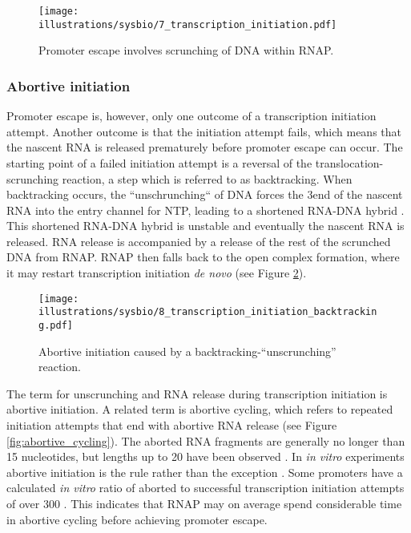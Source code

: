 \begin{figure}[htb]
	\begin{center}
		\texttt{[image: illustrations/sysbio/7\_transcription\_initiation.pdf]}
	\end{center}
	\caption{Promoter escape involves scrunching of DNA within RNAP.}
	\label{fig:simple_escape}
\end{figure}

\subsubsection{Abortive initiation}
Promoter escape is, however, only one outcome of a transcription initiation
attempt. Another outcome is that the initiation attempt fails, which means that
the nascent RNA is released prematurely before promoter escape can occur. The
starting point of a failed initiation attempt is a reversal of the
translocation-scrunching reaction, a step which is referred to as backtracking.
When backtracking occurs, the ``unschrunching`` of DNA forces the 3\ppp end of
the nascent RNA into the entry channel for NTP, leading to a shortened RNA-DNA
hybrid \cite{hsu_initial_2006}. This shortened RNA-DNA hybrid is unstable and
eventually the nascent RNA is released. RNA release is accompanied by a release
of the rest of the scrunched DNA from RNAP. RNAP then falls back to the open
complex formation, where it may restart transcription initiation \textit{de
novo} \cite{lilian_m_promoter_2002} (see Figure \ref{fig:abortive_backtrack}).

\begin{figure}[htb]
	\begin{center}
		\texttt{[image: illustrations/sysbio/8\_transcription\_initiation\_backtracking.pdf]}
	\end{center}
	\caption{Abortive initiation caused by a backtracking-``unscrunching''
	reaction.}
	\label{fig:abortive_backtrack}
\end{figure}

The term for unscrunching and RNA release during transcription initiation is
abortive initiation. A related term is abortive cycling, which refers to
repeated initiation attempts that end with abortive RNA release (see Figure
\ref{fig:abortive_cycling}). The aborted RNA fragments are generally no longer
than 15 nucleotides, but lengths up to 20 have been observed
\cite{chander_alternate_2007}. In \textit{in vitro} experiments abortive
initiation is the rule rather than the exception \cite{lilian_m_promoter_2002}.
Some promoters have a calculated \textit{in vitro} ratio of aborted to
successful transcription initiation attempts of over 300
\cite{hsu_initial_2006}. This indicates that RNAP may on average spend
considerable time in abortive cycling before achieving promoter escape.

